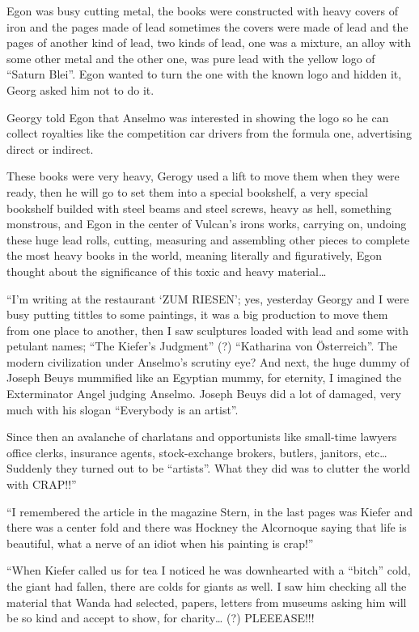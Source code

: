 \documentclass[smalldemyvopaper,11pt,twoside,onecolumn,openright,extrafontsizes]{memoir}
\begin{document}
\ornamentbreak

Egon was busy cutting metal, the books were constructed with heavy covers of iron and the pages made of lead sometimes the covers were made of lead and the pages of another kind of lead, two kinds of lead, one was a mixture, an alloy with some other metal and the other one, was pure lead with the yellow logo of “Saturn Blei”. Egon wanted to turn the one with the known logo and hidden it, Georg asked him not to do it.

Georgy told Egon that Anselmo was interested in showing the logo so he can collect royalties like the competition car drivers from the formula one, advertising direct or indirect.

These books were very heavy, Gerogy used a lift to move them when they were ready, then he will go to set them into a special bookshelf, a very special bookshelf builded with steel beams and steel screws, heavy as hell, something monstrous, and Egon in the center of Vulcan’s irons works, carrying on, undoing these huge lead rolls, cutting, measuring and assembling other pieces to complete the most heavy books in the world, meaning literally and figuratively, Egon thought about the significance of this toxic and heavy material… 

\ornamentbreak

“I’m writing at the restaurant ‘ZUM RIESEN’; yes, yesterday Georgy and I were busy putting tittles to some paintings, it was a big production to move them from one place to another, then I saw sculptures loaded with lead and some with petulant names; “The Kiefer’s Judgment” (?) “Katharina von Österreich”. The modern civilization under Anselmo’s scrutiny eye? And next, the huge dummy of Joseph Beuys mummified like an Egyptian mummy, for eternity, I imagined the Exterminator Angel judging Anselmo. Joseph Beuys did a lot of damaged, very much with his slogan “Everybody is an artist”.

Since then an avalanche of charlatans and opportunists like small-time lawyers office clerks, insurance agents, stock-exchange brokers, butlers, janitors, etc… Suddenly they turned out to be “artists”. What they did was to clutter the world with CRAP!!”

“I remembered the article in the magazine Stern, in the last pages was Kiefer and there was a center fold and there was Hockney the Alcornoque saying that life is beautiful, what a nerve of an idiot when his painting is crap!”

“When Kiefer called us for tea I noticed he was downhearted with a “bitch” cold, the giant had fallen, there are colds for giants as well. I saw him checking all the material that Wanda had selected, papers, letters from museums asking him will be so kind and accept to show, for charity… (?) PLEEEASE!!!
\end{document}
